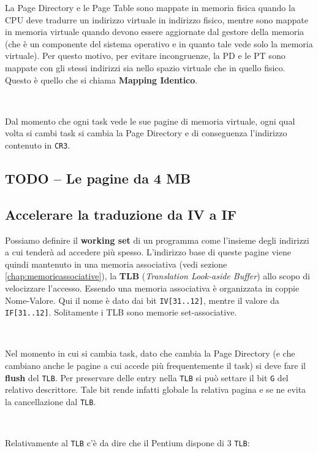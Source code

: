 \documentclass[11pt]{book}
\begin{document}
La Page Directory e le Page Table sono mappate in memoria fisica
quando la CPU deve tradurre un indirizzo virtuale in indirizzo fisico,
mentre sono mappate in memoria virtuale quando devono essere
aggiornate dal gestore della memoria (che \`e un componente del
sistema operativo e in quanto tale vede solo la memoria virtuale). Per
questo motivo, per evitare incongruenze, la PD e le PT sono mappate
con gli stessi indirizzi sia nello spazio virtuale che in quello
fisico. Questo \`e quello che si chiama \textbf{Mapping Identico}.

\

Dal momento che ogni task vede le sue pagine di memoria virtuale, ogni
qual volta si cambi task si cambia la Page Directory e di conseguenza
l'indirizzo contenuto in \texttt{CR3}.

\subsection{TODO -- Le pagine da 4 MB}


\subsection{Accelerare la traduzione da IV a IF}

Possiamo definire il \textbf{working set} di un programma come
l'insieme degli indirizzi a cui tender\`a ad accedere pi\`u
spesso. L'indirizzo base di queste pagine viene quindi mantenuto in
una memoria associativa (vedi sezione \ref{chap:memorieassociative}),
la \textbf{TLB} (\textit{Translation Look-aside Buffer}) allo scopo di
velocizzare l'accesso. Essendo una memoria associativa \`e organizzata
in coppie Nome-Valore. Qui il nome \`e dato dai bit
\texttt{IV[31..12]}, mentre il valore da
\texttt{IF[31..12]}. Solitamente i TLB sono memorie set-associative.

\

Nel momento in cui si cambia task, dato che cambia la Page Directory
(e che cambiano anche le pagine a cui accede pi\`u frequentemente il
task) si deve fare il \textbf{flush} del \texttt{TLB}. Per preservare
delle entry nella \texttt{TLB} si pu\`o settare il bit \texttt{G} del
relativo descrittore. Tale bit rende infatti globale la relativa
pagina e se ne evita la cancellazione dal \texttt{TLB}.

\ 

Relativamente al \texttt{TLB} c'\`e da dire che il Pentium dispone di
3 \texttt{TLB}:
\end{document}
